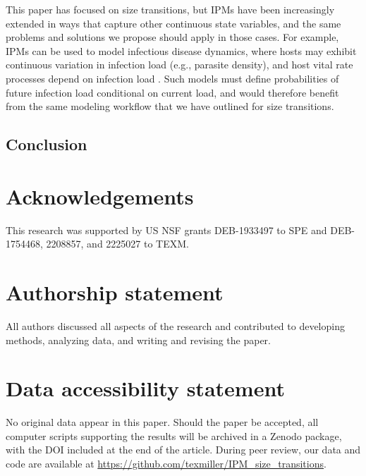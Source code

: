 \documentclass[12pt]{article}
\begin{document}
This paper has focused on size transitions, but IPMs have been increasingly extended in ways that capture other continuous state variables, and the same problems and solutions we propose should apply in those cases. 
For example, IPMs can be used to model infectious disease dynamics, where hosts may exhibit continuous variation in infection load (e.g., parasite density), and host vital rate processes depend on infection load \citep{metcalf2016opportunities,wilber2016integral}. 
Such models must define probabilities of future infection load conditional on current load, and would therefore benefit from the same modeling workflow that we have outlined for size transitions.

\subsection{Conclusion}



\section*{Acknowledgements} 
This research was supported by US NSF grants DEB-1933497 to SPE and DEB-1754468, 2208857, and 2225027 to TEXM. 

\section{Authorship statement} 
All authors discussed all aspects of the research and contributed to developing methods, analyzing data, and writing and revising the paper.  

\section{Data accessibility statement}
No original data appear in this paper. Should the paper be accepted, all computer scripts supporting the results will be archived in a Zenodo package, with the DOI included at the end of the article. 
During peer review, our data and code are available at \url{https://github.com/texmiller/IPM_size_transitions}. 
	
\newpage 

%



\newpage 
\clearpage 
\setcounter{equation}{0}
\setcounter{figure}{0}
\setcounter{section}{0}
\setcounter{table}{0}
\setcounter{Box}{0}
\renewcommand{\theequation}{S.\arabic{equation}}
\renewcommand{\thetable}{S-\arabic{table}}
\renewcommand{\thefigure}{S-\arabic{figure}}
\renewcommand{\theBox}{S-\arabic{Box}}
\renewcommand{\thesection}{S.\arabic{section}}
\end{document}
